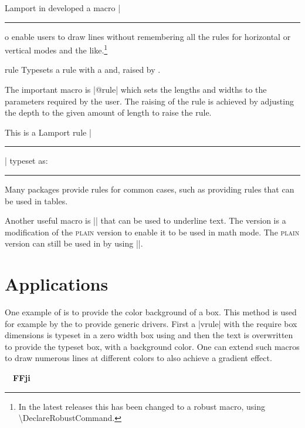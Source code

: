 Lamport in \latex developed a macro |\rule| to enable users to draw lines without remembering all the rules for horizontal or vertical modes and the like.\footnote{In the latest releases this has been changed to a robust macro, using \textbackslash DeclareRobustCommand.}

\begin{docCommand}{rule}{ }
Typesets a rule with a   and, raised by .
\end{docCommand}

\begin{teX}
\def\rule{\@ifnextchar[\@rule{\@rule[\z@]}}%
\def\@rule[#1]#2#3{%
\leavevmode
\hbox{%
  \setlength\@tempdima{#1}%
  \setlength\@tempdimb{#2}%
  \setlength\@tempdimc{#3}%
  \advance\@tempdimc\@tempdima
  \vrule\@width\@tempdimb\@height\@tempdimc\@depth-\@tempdima}
}
\end{teX}

The important macro is |@rule| which sets the lengths and widths to the parameters required by the user. The raising of the rule is achieved by adjusting the depth to the given amount of length to raise the rule.

This is a Lamport rule |\rule[6.5pt]{4pt}{7pt}| typeset as:\rule[6.5pt]{4pt}{7pt} Many \latexe packages 
provide rules for common cases, such as  providing rules that can be used in tables. 

Another useful \latexe macro is |\underline| that can be used to underline text. The \latex version is a modification of the \textsc{plain} version to enable it to be used in math mode. The \textsc{plain} version can still be used in \latexe by using |\@@underline|. 

\section{Applications}

One example of  is to provide the color background of a box. This method is used for
example by the  to provide generic drivers. First a |vrule| with the require box dimensions
is typeset in a zero width box using  and then the text is overwritten to provide the typeset box, with a background color. One can extend such macros to draw numerous lines at different colors to also 
achieve  a gradient effect.


\begin{texexample}{}{}
\makeatletter
\bgroup
\renewcommand*\color@block[3]%
{{%
\color{blue}%
    \rlap{%
      \ifcolors@
        \vrule\@width#1\@height#2\@depth#3
      \fi
    }%
}} 
\hbox{\color@block{80pt}{30pt}{3.5pt}%
      \sffamily\bfseries\Huge\color{white}FFji}
\egroup 
\makeatother 
\end{texexample}

